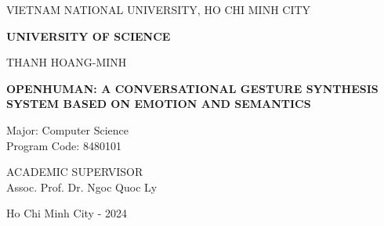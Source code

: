 \begin{titlepage}
	
	\begin{mdframed}[linewidth=1pt, 
		linecolor=black, 
		innerleftmargin=10mm, 
		innerrightmargin=10mm, 
		innertopmargin=10mm, 
		innerbottommargin=10mm]
		
		\centering
		\vspace*{1cm}
		
		{VIETNAM NATIONAL UNIVERSITY, HO CHI MINH CITY\par}
		\vspace{0.25cm}
		\textbf{UNIVERSITY OF SCIENCE}\\
		
		\vspace{2cm}
		
		\large THANH HOANG-MINH \\
		
		\vspace{2cm}
		
		\Large \textbf{\MakeUppercase{OpenHuman: A Conversational Gesture Synthesis System Based on Emotion and Semantics}}\\
		
		\vspace{1cm}
		
		\flushleft
		{\normalsize Major: Computer Science}\\
		{\normalsize Program Code: 8480101}\\
		
		\vspace{2cm}
		
		\centering
		{\normalsize ACADEMIC SUPERVISOR}\\ 
		{\normalsize Assoc. Prof. Dr. Ngoc Quoc Ly}\\
		
		\vfill
		\vspace{3cm}
		
		{\small Ho Chi Minh City - 2024}
	\end{mdframed}
\end{titlepage}

\pagebreak
{}

\pagebreak

	
